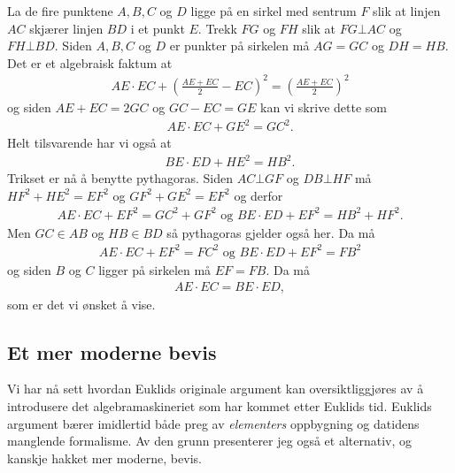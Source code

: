 \documentclass[norsk,twoside,utf8]{article}
\newcommand{\EQU}[1] { \begin{equation*} \begin{split} #1 \end{split} \end{equation*} }
\begin{document}
\noindent
La de fire punktene $A,B,C$ og $D$ ligge på en sirkel med sentrum $F$ slik at linjen $AC$ skjærer linjen $BD$ i et punkt $E$. Trekk $FG$ og $FH$ slik at $FG \bot AC$ og $FH \bot BD$. Siden $A,B,C$ og $D$ er punkter på sirkelen må $AG=GC$ og $DH=HB$. Det er et algebraisk faktum at
\EQU{
AE \cdot EC + \left(\frac{AE+EC}{2}-EC\right)^2= \left(\frac{AE+EC}{2}\right)^2
}
og siden $AE+EC=2GC$ og $GC-EC=GE$ kan vi skrive dette som
\EQU{
AE \cdot EC + GE^2= GC^2.
}
Helt tilsvarende har vi også at
\EQU{
BE \cdot ED + HE^2 = HB^2.
}
Trikset er nå å benytte pythagoras. Siden $AC \bot GF$ og $DB \bot HF$ må $HF^2 + HE^2 = EF^2$ og $GF^2+GE^2=EF^2$ og derfor
\EQU{
AE \cdot EC + EF^2= GC^2 + GF^2 \mbox{ og } BE \cdot ED + EF^2 = HB^2 + HF^2.
}
Men $GC \in AB$ og $HB \in BD$ så pythagoras gjelder også her. Da må
\EQU{
AE \cdot EC + EF^2= FC^2 \mbox{ og } BE \cdot ED + EF^2 = FB^2
}
og siden $B$ og $C$ ligger på sirkelen må $EF=FB$. Da må
\EQU{
AE \cdot EC = BE \cdot ED,
}
som er det vi ønsket å vise.


\subsection{Et mer moderne bevis}
Vi har nå sett hvordan Euklids originale argument kan oversiktliggjøres av å introdusere det algebramaskineriet som har kommet etter Euklids tid. Euklids argument bærer imidlertid både preg av \textit{elementers} oppbygning og datidens manglende formalisme. Av den grunn presenterer jeg også et alternativ, og kanskje hakket mer moderne, bevis. \newline
\end{document}

